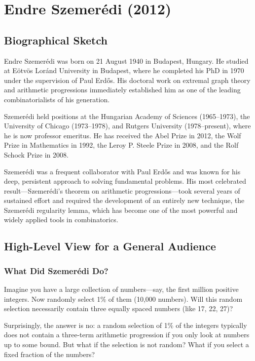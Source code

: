 \chapter{Endre Szemer\'edi (2012)}

\section{Biographical Sketch}

Endre Szemer\'edi was born on 21 August 1940 in Budapest, Hungary. He studied at E\"otv\"os Lor\'and University in Budapest, where he completed his PhD in 1970 under the supervision of Paul Erd\H{o}s. His doctoral work on extremal graph theory and arithmetic progressions immediately established him as one of the leading combinatorialists of his generation.

Szemer\'edi held positions at the Hungarian Academy of Sciences (1965--1973), the University of Chicago (1973--1978), and Rutgers University (1978--present), where he is now professor emeritus. He has received the Abel Prize in 2012, the Wolf Prize in Mathematics in 1992, the Leroy P. Steele Prize in 2008, and the Rolf Schock Prize in 2008.

Szemer\'edi was a frequent collaborator with Paul Erd\H{o}s and was known for his deep, persistent approach to solving fundamental problems. His most celebrated result---Szemer\'edi's theorem on arithmetic progressions---took several years of sustained effort and required the development of an entirely new technique, the Szemer\'edi regularity lemma, which has become one of the most powerful and widely applied tools in combinatorics.

\section{High-Level View for a General Audience}

\subsection{What Did Szemer\'edi Do?}

Imagine you have a large collection of numbers---say, the first million positive integers. Now randomly select 1\% of them (10,000 numbers). Will this random selection necessarily contain three equally spaced numbers (like 17, 22, 27)?

Surprisingly, the answer is no: a random selection of 1\% of the integers typically does not contain a three-term arithmetic progression if you only look at numbers up to some bound. But what if the selection is not random? What if you select a fixed fraction of the numbers?

